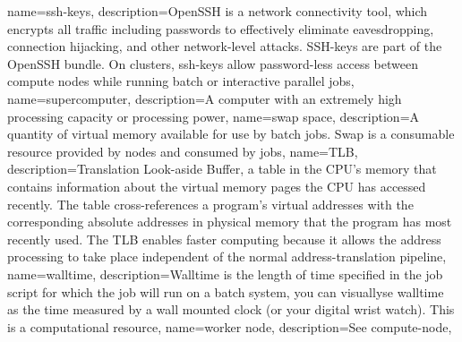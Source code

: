 {
  name={ssh-keys},
  description={OpenSSH is a network connectivity tool, which encrypts all traffic including passwords to effectively eliminate eavesdropping, connection hijacking, and other network-level attacks. SSH-keys are part of the OpenSSH bundle. On \hpc clusters, ssh-keys allow password-less access between compute nodes while running batch or interactive parallel jobs},
}
{
  name={supercomputer},
  description={A computer with an extremely high processing capacity or processing power},
}
{
  name={swap space},
  description={A quantity of virtual memory available for use by batch jobs. Swap is a consumable resource provided by nodes and consumed by jobs},
}
{
  name={TLB},
  description={Translation Look-aside Buffer, a table in the CPU's memory that contains information about the virtual memory pages the CPU has accessed recently. The table cross-references a program's virtual addresses with the corresponding absolute addresses in physical memory that the program has most recently used. The TLB enables faster computing because it allows the address processing to take place independent of the normal address-translation pipeline},
}
{
  name={walltime},
  description={Walltime is the length of time specified in the job script for which the job will run on a batch system, you can visuallyse walltime as the time measured by a wall mounted clock (or your digital wrist watch). This is a computational resource},
}
{
  name={worker node},
  description={See \gls{compute-node}},
}



